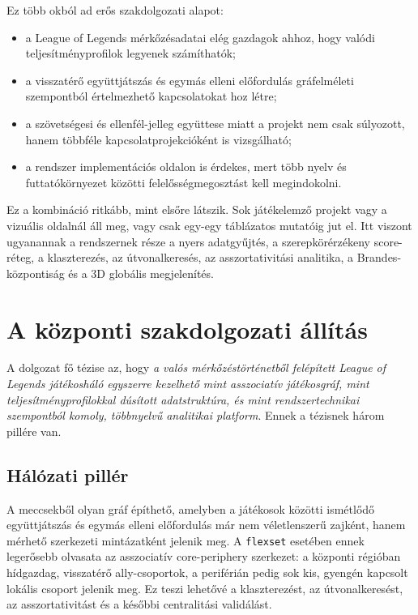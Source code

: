 ﻿\documentclass[a4paper,12pt]{report}
\begin{document}
Ez több okból ad erős szakdolgozati alapot:

\begin{itemize}
    \item a League of Legends mérkőzésadatai elég gazdagok ahhoz, hogy valódi teljesítményprofilok legyenek számíthatók;
    \item a visszatérő együttjátszás és egymás elleni előfordulás gráfelméleti szempontból értelmezhető kapcsolatokat hoz létre;
    \item a szövetségesi és ellenfél-jelleg együttese miatt a projekt nem csak súlyozott, hanem többféle kapcsolatprojekcióként is vizsgálható;
    \item a rendszer implementációs oldalon is érdekes, mert több nyelv és futtatókörnyezet közötti felelősségmegosztást kell megindokolni.
\end{itemize}

Ez a kombináció ritkább, mint elsőre látszik. Sok játékelemző projekt vagy a vizuális oldalnál áll meg, vagy csak egy-egy táblázatos mutatóig jut el. Itt viszont ugyanannak a rendszernek része a nyers adatgyűjtés, a szerepkörérzékeny score-réteg, a klaszterezés, az útvonalkeresés, az asszortativitási analitika, a Brandes-központiság és a 3D globális megjelenítés.

\section{A központi szakdolgozati állítás}

A dolgozat fő tézise az, hogy \emph{a valós mérkőzéstörténetből felépített League of Legends játékosháló egyszerre kezelhető mint asszociatív játékosgráf, mint teljesítményprofilokkal dúsított adatstruktúra, és mint rendszertechnikai szempontból komoly, többnyelvű analitikai platform}. Ennek a tézisnek három pillére van.

\subsection{Hálózati pillér}

A meccsekből olyan gráf építhető, amelyben a játékosok közötti ismétlődő együttjátszás és egymás elleni előfordulás már nem véletlenszerű zajként, hanem mérhető szerkezeti mintázatként jelenik meg. A \texttt{flexset} esetében ennek legerősebb olvasata az asszociatív core-periphery szerkezet: a központi régióban hídgazdag, visszatérő ally-csoportok, a periférián pedig sok kis, gyengén kapcsolt lokális csoport jelenik meg. Ez teszi lehetővé a klaszterezést, az útvonalkeresést, az asszortativitást és a későbbi centralitási validálást.
\end{document}
